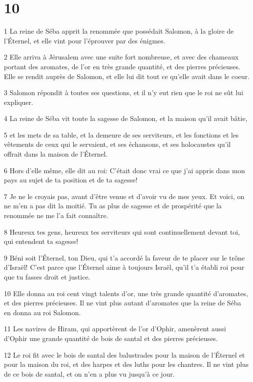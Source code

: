 \chapter{10}

\par 1 La reine de Séba apprit la renommée que possédait Salomon, à la gloire de l'Éternel, et elle vint pour l'éprouver par des énigmes.
\par 2 Elle arriva à Jérusalem avec une suite fort nombreuse, et avec des chameaux portant des aromates, de l'or en très grande quantité, et des pierres précieuses. Elle se rendit auprès de Salomon, et elle lui dit tout ce qu'elle avait dans le coeur.
\par 3 Salomon répondit à toutes ses questions, et il n'y eut rien que le roi ne sût lui expliquer.
\par 4 La reine de Séba vit toute la sagesse de Salomon, et la maison qu'il avait bâtie,
\par 5 et les mets de sa table, et la demeure de ses serviteurs, et les fonctions et les vêtements de ceux qui le servaient, et ses échansons, et ses holocaustes qu'il offrait dans la maison de l'Éternel.
\par 6 Hors d'elle même, elle dit au roi: C'était donc vrai ce que j'ai appris dans mon pays au sujet de ta position et de ta sagesse!
\par 7 Je ne le croyais pas, avant d'être venue et d'avoir vu de mes yeux. Et voici, on ne m'en a pas dit la moitié. Tu as plus de sagesse et de prospérité que la renommée ne me l'a fait connaître.
\par 8 Heureux tes gens, heureux tes serviteurs qui sont continuellement devant toi, qui entendent ta sagesse!
\par 9 Béni soit l'Éternel, ton Dieu, qui t'a accordé la faveur de te placer sur le trône d'Israël! C'est parce que l'Éternel aime à toujours Israël, qu'il t'a établi roi pour que tu fasses droit et justice.
\par 10 Elle donna au roi cent vingt talents d'or, une très grande quantité d'aromates, et des pierres précieuses. Il ne vint plus autant d'aromates que la reine de Séba en donna au roi Salomon.
\par 11 Les navires de Hiram, qui apportèrent de l'or d'Ophir, amenèrent aussi d'Ophir une grande quantité de bois de santal et des pierres précieuses.
\par 12 Le roi fit avec le bois de santal des balustrades pour la maison de l'Éternel et pour la maison du roi, et des harpes et des luths pour les chantres. Il ne vint plus de ce bois de santal, et on n'en a plus vu jusqu'à ce jour.
